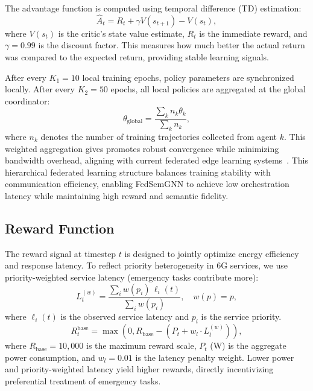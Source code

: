 \documentclass[conference]{IEEEtran}
\begin{document}
		The advantage function is computed using temporal difference (TD) estimation:
		\begin{equation}
			\hat{A}_t = R_t + \gamma V(s_{t+1}) - V(s_t),
		\end{equation}
		where $V(s_t)$ is the critic's state value estimate, $R_t$ is the immediate reward, and $\gamma = 0.99$ is the discount factor. This measures how much better the actual return was compared to the expected return, providing stable learning signals.
		
		After every $K_1 = 10$ local training epochs, policy parameters are synchronized locally. After every $K_2 = 50$ epochs, all local policies are aggregated at the global coordinator:
		\begin{equation}
			\theta_{\text{global}} = \frac{\sum_{k} n_k \theta_k}{\sum_{k} n_k},
		\end{equation}
		where $n_k$ denotes the number of training trajectories collected from agent $k$. This weighted aggregation gives promotes robust convergence while minimizing bandwidth overhead, aligning with current federated edge learning systems~\cite{zhou2024robustfl, yurdem2024federated}. This hierarchical federated learning structure balances training stability with communication efficiency, enabling FedSemGNN to achieve low orchestration latency while maintaining high reward and semantic fidelity.
		
		\subsection{Reward Function}
		The reward signal at timestep $t$ is designed to jointly optimize energy efficiency and response latency. To reflect priority heterogeneity in 6G services, we use priority-weighted service latency (emergency tasks contribute more):
		\begin{equation}
			L_t^{(w)} = \frac{\sum_i w(p_i)\,\ell_i(t)}{\sum_i w(p_i)},\quad w(p)=p, 
		\end{equation}
		where $\ell_i(t)$ is the observed service latency and $p_i$ is the service priority.
		\begin{equation}
			R_t^{\text{base}} = \max\!\left(0, R_{\text{base}} - \left(P_t + w_l \cdot L_t^{(w)}\right)\right),
			\label{eq:base_reward}
		\end{equation}
		where $R_{\text{base}} = 10{,}000$ is the maximum reward scale, $P_t$ (W) is the aggregate power consumption, and $w_l = 0.01$ is the latency penalty weight. Lower power and priority-weighted latency yield higher rewards, directly incentivizing preferential treatment of emergency tasks.
		
\end{document}

